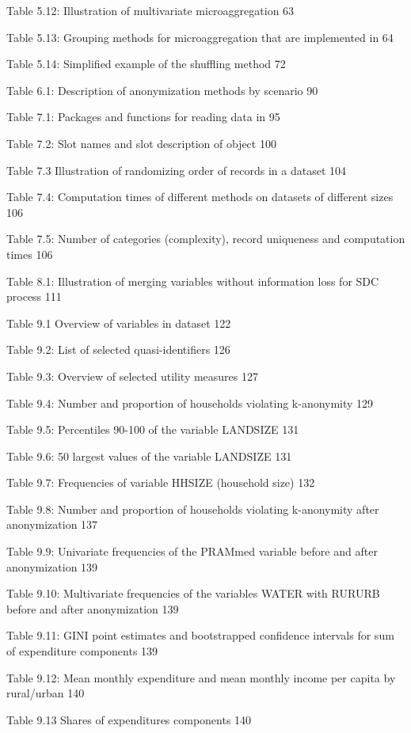 \documentclass[letterpaper,10pt,english]{sphinxmanual}
\begin{document}
Table 5.12: Illustration of multivariate microaggregation 63

Table 5.13: Grouping methods for microaggregation that are implemented
in  64

Table 5.14: Simplified example of the shuffling method 72

Table 6.1: Description of anonymization methods by scenario 90

Table 7.1: Packages and functions for reading data in  95

Table 7.2: Slot names and slot description of  object 100

Table 7.3 Illustration of randomizing order of records in a dataset 104

Table 7.4: Computation times of different methods on datasets of
different sizes 106

Table 7.5: Number of categories (complexity), record uniqueness and
computation times 106

Table 8.1: Illustration of merging variables without information loss
for SDC process 111

Table 9.1 Overview of variables in dataset 122

Table 9.2: List of selected quasi-identifiers 126

Table 9.3: Overview of selected utility measures 127

Table 9.4: Number and proportion of households violating k-anonymity 129

Table 9.5: Percentiles 90-100 of the variable LANDSIZE 131

Table 9.6: 50 largest values of the variable LANDSIZE 131

Table 9.7: Frequencies of variable HHSIZE (household size) 132

Table 9.8: Number and proportion of households violating k-anonymity
after anonymization 137

Table 9.9: Univariate frequencies of the PRAMmed variable before and
after anonymization 139

Table 9.10: Multivariate frequencies of the variables WATER with RURURB
before and after anonymization 139

Table 9.11: GINI point estimates and bootstrapped confidence intervals
for sum of expenditure components 139

Table 9.12: Mean monthly expenditure and mean monthly income per capita
by rural/urban 140

Table 9.13 Shares of expenditures components 140
\end{document}
